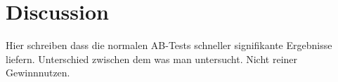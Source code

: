 \documentclass[main.tex]{subfiles}
\begin{document}
\chapter{Discussion}

Hier schreiben dass die normalen AB-Tests schneller signifikante Ergebnisse liefern. Unterschied zwischen dem was man untersucht. Nicht reiner Gewinnnutzen.
\end{document}
